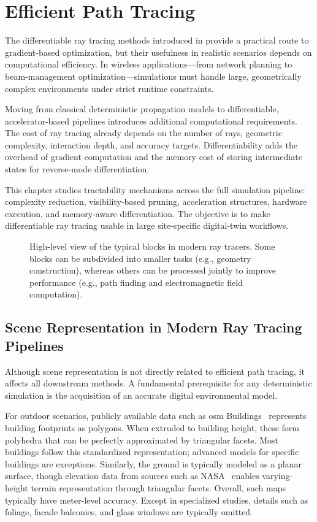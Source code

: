 \chapter{Efficient Path Tracing}

The differentiable ray tracing methods introduced in  provide a practical route to gradient-based optimization, but their usefulness in realistic scenarios depends on computational efficiency. In wireless applications---from network planning to beam-management optimization---simulations must handle large, geometrically complex environments under strict runtime constraints.

Moving from classical deterministic propagation models to differentiable, accelerator-based pipelines introduces additional computational requirements. The cost of ray tracing already depends on the number of rays, geometric complexity, interaction depth, and accuracy targets. Differentiability adds the overhead of gradient computation and the memory cost of storing intermediate states for reverse-mode differentiation.

This chapter studies tractability mechanisms across the full simulation pipeline: complexity reduction, visibility-based pruning, acceleration structures, hardware execution, and memory-aware differentiation. The objective is to make differentiable ray tracing usable in large site-specific digital-twin workflows.

\begin{figure}
  \centering
  \caption{High-level view of the typical blocks in modern ray tracers. Some blocks can be subdivided into smaller tasks (e.g., geometry construction), whereas others can be processed jointly to improve performance (e.g., path finding and electromagnetic field computation).}
\end{figure}

\section{Scene Representation in Modern Ray Tracing Pipelines}

Although scene representation is not directly related to efficient path tracing, it affects all downstream methods. A fundamental prerequisite for any deterministic simulation is the acquisition of an accurate digital environmental model.

For outdoor scenarios, publicly available data such as \gls{osm} Buildings~ represents building footprints as polygons. When extruded to building height, these form polyhedra that can be perfectly approximated by triangular facets. Most buildings follow this standardized representation; advanced models for specific buildings are exceptions. Similarly, the ground is typically modeled as a planar surface, though elevation data from sources such as NASA~ enables varying-height terrain representation through triangular facets. Overall, such maps typically have meter-level accuracy. Except in specialized studies, details such as foliage, facade balconies, and glass windows are typically omitted.

